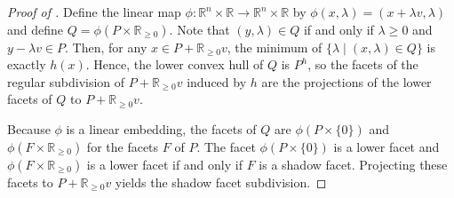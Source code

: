 \documentclass[12pt]{amsart}
\newcommand{\mb}{\mathbb}
\newcommand{\mc}{\mathcal}
\theoremstyle{plain}
\theoremstyle{definition}
\theoremstyle{remark}
\begin{document}
\begin{proof}[Proof of ]
Define the linear map $\phi : \mb{R}^n \times \mb{R} \to \mb{R}^n \times \mb{R}$ by $\phi(x, \lambda) = (x + \lambda v, \lambda)$ and define $Q = \phi(P \times \mb{R}_{\geq 0})$. Note that $(y,\lambda) \in Q$ if and only if $\lambda \ge 0$ and $y-\lambda v \in P$. Then, for any $x \in P + \mb{R}_{\geq 0}v$, the minimum of $\{\lambda \mid (x, \lambda) \in Q\}$ is exactly $h(x)$. Hence, the lower convex hull of $Q$ is $P^h$, so the facets of the regular subdivision of $P + \mb{R}_{\geq 0}v$ induced by $h$ are the projections of the lower facets of $Q$ to $P + \mb{R}_{\geq 0}v$.

Because $\phi$ is a linear embedding, the facets of $Q$ are $\phi(P \times \{0\})$ and $\phi(F \times \mb{R}_{\geq 0})$ for the facets $F$ of $P$. The facet $\phi(P \times \{0\})$ is a lower facet and $\phi(F \times \mb{R}_{\geq 0})$ is a lower facet if and only if $F$ is a shadow facet. Projecting these facets to $P + \mb{R}_{\geq 0}v$ yields the shadow facet subdivision.

\end{proof}
\end{document}
